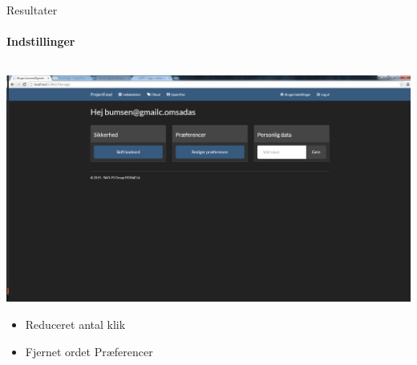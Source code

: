 \begin{frame}{Resultater}
\framesubtitle{Indstillinger}


	
	\begin{minipage}[0.3\textheight]{\textwidth}
	\begin{columns}[T]
	\begin{column}{1\textwidth}
	
	\vspace{-15 pt}
	 \includegraphics[width=1\textwidth,height=1\textheight,keepaspectratio, trim={1cm 0 0 16mm}, clip]{images/Screenshots/SettingsOld.png}
	 
	 \begin{itemize}
	 		 	\item Reduceret antal klik
	 		 	\item Fjernet ordet Præferencer
	 \end{itemize}
	
	\end{column}

	\end{columns}

  \end{minipage}
	
\end{frame}
